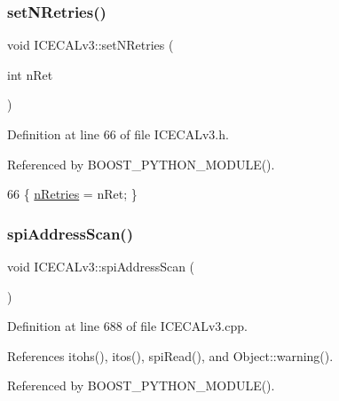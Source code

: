 \subsubsection{\texorpdfstring{set\+N\+Retries()}{setNRetries()}}
{\footnotesize\ttfamily void I\+C\+E\+C\+A\+Lv3\+::set\+N\+Retries (\begin{DoxyParamCaption}\item[{int}]{n\+Ret }\end{DoxyParamCaption})\hspace{0.3cm}{\ttfamily [inline]}}



Definition at line 66 of file I\+C\+E\+C\+A\+Lv3.\+h.



Referenced by B\+O\+O\+S\+T\+\_\+\+P\+Y\+T\+H\+O\+N\+\_\+\+M\+O\+D\+U\+L\+E().


\begin{DoxyCode}
66 \{   \hyperlink{classICECALv3_ae877ce34b3a4d6c368cc6409ac9614fa}{nRetries} = nRet;                                \}
\end{DoxyCode}
\mbox{\label{classICECALv3_acbf1a7a8510d7e02280bacc58badf4f4}} 
\subsubsection{\texorpdfstring{spi\+Address\+Scan()}{spiAddressScan()}}
{\footnotesize\ttfamily void I\+C\+E\+C\+A\+Lv3\+::spi\+Address\+Scan (\begin{DoxyParamCaption}{ }\end{DoxyParamCaption})}



Definition at line 688 of file I\+C\+E\+C\+A\+Lv3.\+cpp.



References itohs(), itos(), spi\+Read(), and Object\+::warning().



Referenced by B\+O\+O\+S\+T\+\_\+\+P\+Y\+T\+H\+O\+N\+\_\+\+M\+O\+D\+U\+L\+E().



